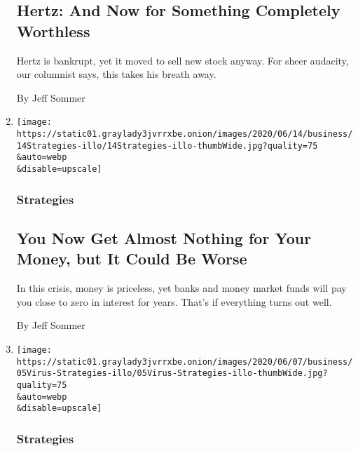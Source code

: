 \begin{enumerate}
  \hypertarget{hertz-and-now-for-something-completely-worthless}{%
  \subsection{Hertz: And Now for Something Completely
  Worthless}\label{hertz-and-now-for-something-completely-worthless}}

  Hertz is bankrupt, yet it moved to sell new stock anyway. For sheer
  audacity, our columnist says, this takes his breath away.

  By Jeff Sommer
\item
  \href{/2020/06/12/business/emergency-fund-money-market.html}{}

  \texttt{[image: https://static01.graylady3jvrrxbe.onion/images/2020/06/14/business/14Strategies-illo/14Strategies-illo-thumbWide.jpg?quality=75\\\&auto=webp\\\&disable=upscale]}

  \hypertarget{strategies-4}{%
  \subsubsection{Strategies}\label{strategies-4}}

  \hypertarget{you-now-get-almost-nothing-for-your-money-but-it-could-be-worse}{%
  \subsection{You Now Get Almost Nothing for Your Money, but It Could Be
  Worse}\label{you-now-get-almost-nothing-for-your-money-but-it-could-be-worse}}

  In this crisis, money is priceless, yet banks and money market funds
  will pay you close to zero in interest for years. That's if everything
  turns out well.

  By Jeff Sommer
\item
  \href{/2020/06/05/business/why-the-stock-market-just-doesnt-care.html}{}

  \texttt{[image: https://static01.graylady3jvrrxbe.onion/images/2020/06/07/business/05Virus-Strategies-illo/05Virus-Strategies-illo-thumbWide.jpg?quality=75\\\&auto=webp\\\&disable=upscale]}

  \hypertarget{strategies-5}{%
  \subsubsection{Strategies}\label{strategies-5}}

  \hypertarget{why-the-stock-market-just-doesnt-care}{%
}
\end{enumerate}
